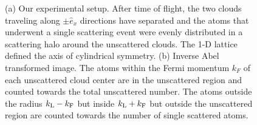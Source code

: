 \documentclass[12pt]{iopart}
\begin{document}
\begin{figure}
\caption{(a) Our experimental setup. After time of flight, the two clouds traveling along $\pm \hat{e}_x$ directions have separated and the atoms that underwent a single scattering event were evenly distributed in a scattering halo around the unscattered clouds. The 1-D lattice defined the axis of cylindrical symmetry. (b) Inverse Abel transformed image. The atoms within the Fermi momentum $k_F$ of each unscattered cloud center are in the unscattered region and counted towards the total unscattered number. The atoms outside the radius $ k_{\rm{L}}-k_{\rm{F}}$ but inside $k_{\rm{L}}+k_{\rm{F}}$ but outside the unscattered region are counted towards the number of single scattered atoms.   }
\label{fig:halo}
\end{figure}
\end{document}
